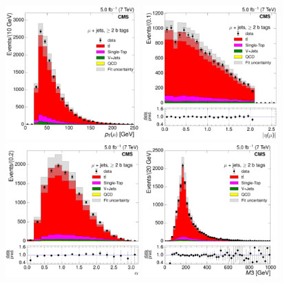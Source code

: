 \begin{figure}[hbtp]
    \centering
     \includegraphics[width=0.46\textwidth]{Chapters/07_08_09_Analysis/Images/control_plots/after_fit/7TeV/muon_pT_2orMoreBtags_with_ratio}\hfill
     \includegraphics[width=0.46\textwidth]{Chapters/07_08_09_Analysis/Images/control_plots/after_fit/7TeV/muon_AbsEta_2orMoreBtags_with_ratio}\\                            
     \includegraphics[width=0.46\textwidth]{Chapters/07_08_09_Analysis/Images/control_plots/after_fit/7TeV/MuPlusJets_angle_bl_2orMoreBtags_with_ratio}\hfill
     \includegraphics[width=0.46\textwidth]{Chapters/07_08_09_Analysis/Images/control_plots/after_fit/7TeV/MuPlusJets_M3_2orMoreBtags_with_ratio}\\     

\end{figure}
